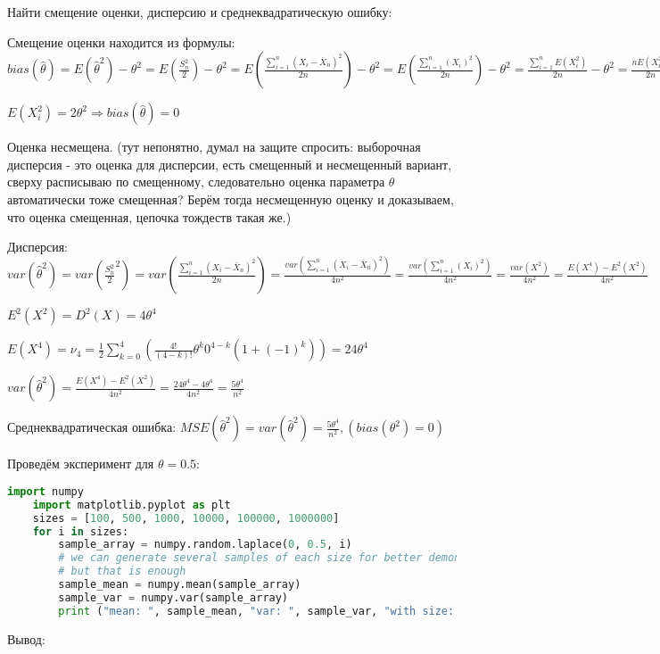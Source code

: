 \documentclass{article}
\begin{document}
Найти смещение оценки, дисперсию и среднеквадратическую ошибку:
\begin{center}
    Смещение оценки находится из формулы: $bias(\hat \theta) = E(\hat \theta^2) - \theta^2 = E(\frac{S^2_n}{2}) - \theta^2 = E(\frac{\sum\limits_{i=1}^{n} (X_i - \bar X_n)^2}{2n}) - \theta^2 = E(\frac{\sum\limits_{i=1}^{n} (X_i)^2}{2n}) - \theta^2 = \frac{\sum\limits_{i=1}^{n} E(X_i^2)}{2n} - \theta^2 = \frac{nE(X_i^2)}{2n} - \theta^2$

    $E(X_i^2) = 2\theta^2 \Longrightarrow bias(\hat \theta) = 0$

    Оценка несмещена. (тут непонятно, думал на защите спросить: выборочная дисперсия - это оценка для дисперсии, есть смещенный и несмещенный вариант, сверху расписываю по смещенному, следовательно оценка параметра $\theta$ автоматически тоже смещенная? Берём тогда несмещенную оценку и доказываем, что оценка смещенная, цепочка тождеств такая же.)
\vspace{5mm}

    Дисперсия: $var(\hat \theta^2) = var(\frac{S^2_n}{2}^2) = var(\frac{\sum\limits_{i=1}^{n} (X_i - \bar X_n)^2}{2n}) = \frac{var(\sum\limits_{i=1}^{n} (X_i - \bar X_n)^2)}{4n^2} = \frac{var(\sum\limits_{i=1}^{n} (X_i)^2)}{4n^2} = \frac{var(X^2)}{4n^2} = \frac{E(X^4) - E^2(X^2)}{4n^2}$

    $E^2(X^2) = D^2(X) = 4\theta^4$

    $E(X^4) = \nu_4 = \frac{1}{2}\sum\limits_{k=0}^{4}(\frac{4!}{(4-k)!}\theta^k0^{4-k}(1+(-1)^k)) = 24\theta^4$

    $var(\hat \theta^2) = \frac{E(X^4) - E^2(X^2)}{4n^2} = \frac{24\theta^4 - 4\theta^4}{4n^2} = \frac{5\theta^4}{n^2}$
\vspace{5mm}

    Среднеквадратическая ошибка: $MSE(\hat \theta^2) = var(\hat \theta^2) = \frac{5\theta^4}{n^2}, ( bias(\theta^2) = 0)$
\end{center}
\newpage

Проведём эксперимент для $\theta=0.5$:

\begin{lstlisting}[language=Python, mathescape=true, breaklines=true]
    import numpy
    import matplotlib.pyplot as plt
    sizes = [100, 500, 1000, 10000, 100000, 1000000]
    for i in sizes:
        sample_array = numpy.random.laplace(0, 0.5, i)
        # we can generate several samples of each size for better demonsration, 
        # but that is enough
        sample_mean = numpy.mean(sample_array)
        sample_var = numpy.var(sample_array)
        print ("mean: ", sample_mean, "var: ", sample_var, "with size: ", i)
\end{lstlisting}
Вывод:
\end{document}

